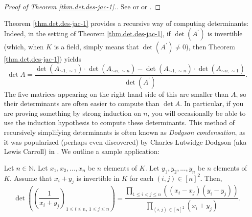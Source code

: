 \begin{proof}
[Proof of Theorem \ref{thm.det.des-jac-1}.]See \cite[Proposition
6.122]{detnotes} or \cite[\S 3.5, proof of Theorem 3.12]{Bresso99} or
\cite{zeilberger-twotime}.
\end{proof}

Theorem \ref{thm.det.des-jac-1} provides a recursive way of computing
determinants: Indeed, in the setting of Theorem \ref{thm.det.des-jac-1}, if
$\det\left(  A^{\prime}\right)  $ is invertible (which, when $K$ is a field,
simply means that $\det\left(  A^{\prime}\right)  \neq0$), then Theorem
\ref{thm.det.des-jac-1}) yields%
\begin{equation}
\det A=\dfrac{\det\left(  A_{\sim1,\sim1}\right)  \cdot\det\left(  A_{\sim
n,\sim n}\right)  -\det\left(  A_{\sim1,\sim n}\right)  \cdot\det\left(
A_{\sim n,\sim1}\right)  }{\det\left(  A^{\prime}\right)  }.
\label{eq.thm.det.des-jac-1.frac}%
\end{equation}
The five matrices appearing on the right hand side of this are smaller than
$A$, so their determinants are often easier to compute than $\det A$. In
particular, if you are proving something by strong induction on $n$, you will
occasionally be able to use the induction hypothesis to compute these
determinants. This method of recursively simplifying determinants is often
known as \emph{Dodgson condensation}, as it was popularized (perhaps even
discovered) by Charles Lutwidge Dodgson (aka Lewis Carroll) in \cite[Appendix
II]{Dodgso67}. We outline a sample application:

\begin{theorem}
\label{thm.det.cauchy}Let $n\in\mathbb{N}$. Let
$x_{1},x_{2},\ldots,x_{n}$ be $n$ elements of $K$. Let $y_{1},y_{2}%
,\ldots,y_{n}$ be $n$ elements of $K$. Assume that $x_{i}+y_{j}$ is invertible
in $K$ for each $\left(  i,j\right)  \in\left[  n\right]  ^{2}$. Then,%
\[
\det\left(  \left(  \dfrac{1}{x_{i}+y_{j}}\right)  _{1\leq i\leq n,\ 1\leq
j\leq n}\right)  =\dfrac{\prod\limits_{1\leq i<j\leq n}\left(  \left(
x_{i}-x_{j}\right)  \left(  y_{i}-y_{j}\right)  \right)  }{\prod
\limits_{\left(  i,j\right)  \in\left[  n\right]  ^{2}}\left(  x_{i}%
+y_{j}\right)  }.
\]

\end{theorem}

